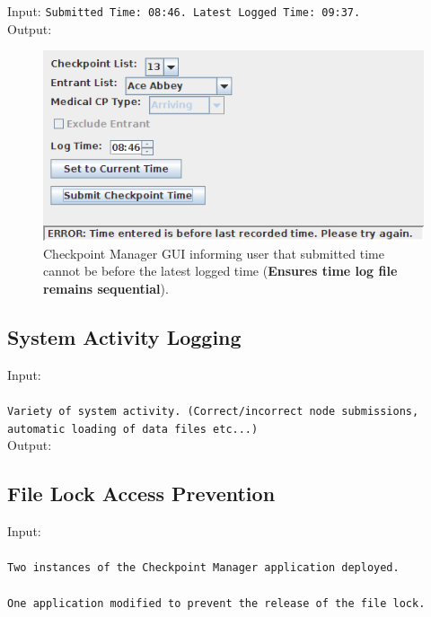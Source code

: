 \documentclass[a4paper, 10pt]{article}
\begin{document}
Input: \verb+Submitted Time: 08:46. Latest Logged Time: 09:37.+ \\

Output:
\begin{figure}[ht!]
\centering
\includegraphics[scale=0.7]{cm-timesubmitfailure.png}
\caption{Checkpoint Manager GUI informing user that submitted time cannot be before the latest logged time (\textbf{Ensures time log file remains sequential}).}
\end{figure}

\subsection{System Activity Logging}

Input:\\\\
\verb+Variety of system activity. (Correct/incorrect node submissions,+\\
\verb+automatic loading of data files etc...)+\\

Output:


\clearpage
\subsection{File Lock Access Prevention}

Input:\\\\
\verb+Two instances of the Checkpoint Manager application deployed.+ \\\\
\verb+One application modified to prevent the release of the file lock.+\\
\end{document}
